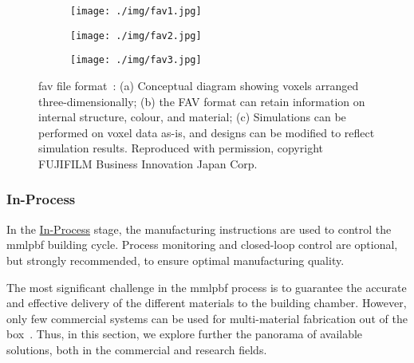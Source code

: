 %
\begin{figure}[!hbtp]
  \centering
  \begin{subfigure}[t]{0.48\textwidth}
  \centering
  \texttt{[image: ./img/fav1.jpg]}%
  \caption{}%
  \label{fig:fav1}
  \end{subfigure}
  \begin{subfigure}[t]{0.48\textwidth}
  \centering
  \texttt{[image: ./img/fav2.jpg]}%
  \caption{}%
  \label{fig:fav2}
  \end{subfigure}
%
  \begin{subfigure}[t]{0.7\textwidth}
  \centering
  \texttt{[image: ./img/fav3.jpg]}%
  \caption{}%
  \label{fig:fav3}
\end{subfigure}
%
%
  \caption[Fabricated Voxel file format]{
    \gls{fav} file format~\cite{fujifilmFAV}: (a) Conceptual diagram showing voxels arranged
    three-dimensionally; (b) the FAV format can retain information on internal
    structure, colour, and material; (c) Simulations can be performed on voxel data as-is, and designs can be modified to reflect simulation results. Reproduced with permission, copyright
    FUJIFILM Business Innovation Japan Corp.}%
    \label{fig:fav}
\end{figure}
%

\subsubsection{In-Process}%
\label{sec:process}
In the \underline{In-Process} stage, the manufacturing instructions are used to
control the \gls{mmlpbf} building cycle. Process monitoring and closed-loop
control are optional, but strongly recommended, to ensure optimal
manufacturing quality.

The most significant challenge in the \gls{mmlpbf}
process is to guarantee the accurate and effective delivery of the different
materials to the building chamber. However, only few commercial systems  can be used for multi-material fabrication
out of the box~\cite{aconityMachinesSite, aerosintPatternDrum2019, slm280}. Thus, in this section, we explore further the
panorama of available solutions, both in the commercial and research fields.

